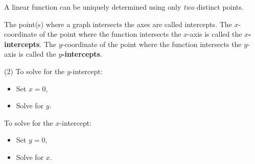 \documentclass[../mathNotesPreamble]{subfiles}
\begin{document}
    \begin{center}
      A linear function can be uniquely determined using only \emph{two} distinct points.
    \end{center}
    \begin{defn*}
      The point(s) where a graph intersects the axes are called intercepts. The $x$-coordinate of the point where the function intersects the $x$-axis is called the \textbf{$x$-intercepts}. The $y$-coordinate of the point where the function intersects the $y$-axis is called the \textbf{$y$-intercepts}.
    \end{defn*}
    \begin{tasks}[label=\textbullet](2)
      \task To solve for the $y$-intercept:
        \begin{itemize}
          \item Set $x=0$,
          \item Solve for $y$.
        \end{itemize}
      \task To solve for the $x$-intercept:
        \begin{itemize}
          \item Set $y=0$,
          \item Solve for $x$.
        \end{itemize}
    \end{tasks}
    \pagebreak
\end{document}
